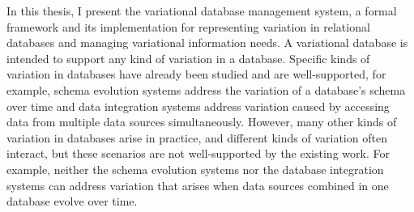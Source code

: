 In this thesis, I present the variational database management system, a formal framework and its
implementation for representing variation in relational databases and managing variational
information needs. 
%
A variational database is intended to support any kind of variation in a database.
Specific kinds of variation in databases have already been studied and are well-supported,
for example, schema evolution systems address the variation of a database's schema
 over time and data integration systems address  variation caused by accessing data 
from multiple data sources simultaneously. 
%
However, many other kinds of variation in databases arise in practice, and different 
kinds of variation often interact, but these scenarios are not well-supported by the existing work.
%
For example, neither the schema evolution systems nor the database integration systems
can address variation that arises when data sources combined in one database
evolve over time.

